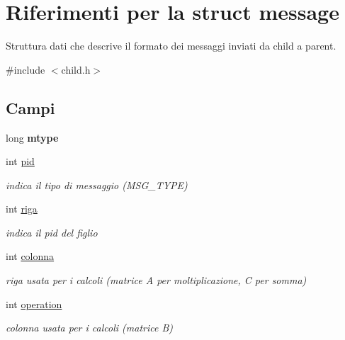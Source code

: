 \hypertarget{structmessage}{}\section{Riferimenti per la struct message}
\label{structmessage}


Struttura dati che descrive il formato dei messaggi inviati da child a parent.  




{\ttfamily \#include $<$child.\+h$>$}

\subsection*{Campi}
\begin{DoxyCompactItemize}
\item 
long {\bfseries mtype}\hypertarget{structmessage_a9e469dd197785e3c791a15cbc10c8626}{}\label{structmessage_a9e469dd197785e3c791a15cbc10c8626}

\item 
int \hyperlink{structmessage_a8a9d17e76a420172b15e2a2fbc99d46e}{pid}\hypertarget{structmessage_a8a9d17e76a420172b15e2a2fbc99d46e}{}\label{structmessage_a8a9d17e76a420172b15e2a2fbc99d46e}

\begin{DoxyCompactList}\small\item\em indica il tipo di messaggio (M\+S\+G\+\_\+\+T\+Y\+PE) \end{DoxyCompactList}\item 
int \hyperlink{structmessage_ac1ed3f951f2b38883f3038f0530126d5}{riga}\hypertarget{structmessage_ac1ed3f951f2b38883f3038f0530126d5}{}\label{structmessage_ac1ed3f951f2b38883f3038f0530126d5}

\begin{DoxyCompactList}\small\item\em indica il pid del figlio \end{DoxyCompactList}\item 
int \hyperlink{structmessage_a70bb2fdef19242fa0aeea37ef51c7bc2}{colonna}\hypertarget{structmessage_a70bb2fdef19242fa0aeea37ef51c7bc2}{}\label{structmessage_a70bb2fdef19242fa0aeea37ef51c7bc2}

\begin{DoxyCompactList}\small\item\em riga usata per i calcoli (matrice A per moltiplicazione, C per somma) \end{DoxyCompactList}\item 
int \hyperlink{structmessage_a4604b383eaa5781bdd8f79b43f6a204e}{operation}\hypertarget{structmessage_a4604b383eaa5781bdd8f79b43f6a204e}{}\label{structmessage_a4604b383eaa5781bdd8f79b43f6a204e}

\begin{DoxyCompactList}\small\item\em colonna usata per i calcoli (matrice B) \end{DoxyCompactList}\end{DoxyCompactItemize}


